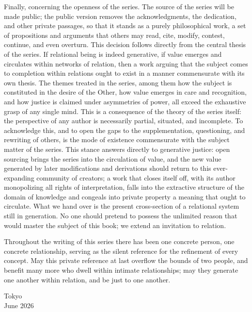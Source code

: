 \documentclass[11pt]{book}
\begin{document}
Finally, concerning the openness of the series. The source of the series will be made public; the public version removes the acknowledgments, the dedication, and other private passages, so that it stands as a purely philosophical work, a set of propositions and arguments that others may read, cite, modify, contest, continue, and even overturn. This decision follows directly from the central thesis of the series. If relational being is indeed generative, if value emerges and circulates within networks of relation, then a work arguing that the subject comes to completion within relations ought to exist in a manner commensurate with its own thesis. The themes treated in the series, among them how the subject is constituted in the desire of the Other, how value emerges in care and recognition, and how justice is claimed under asymmetries of power, all exceed the exhaustive grasp of any single mind. This is a consequence of the theory of the series itself: the perspective of any author is necessarily partial, situated, and incomplete. To acknowledge this, and to open the gaps to the supplementation, questioning, and rewriting of others, is the mode of existence commensurate with the subject matter of the series. This stance answers directly to generative justice: open sourcing brings the series into the circulation of value, and the new value generated by later modifications and derivations should return to this ever-expanding community of creators; a work that closes itself off, with its author monopolizing all rights of interpretation, falls into the extractive structure of the domain of knowledge and congeals into private property a meaning that ought to circulate. What we hand over is the present cross-section of a relational system still in generation. No one should pretend to possess the unlimited reason that would master the subject of this book; we extend an invitation to relation.

Throughout the writing of this series there has been one concrete person, one concrete relationship, serving as the silent reference for the refinement of every concept. May this private reference at last overflow the bounds of two people, and benefit many more who dwell within intimate relationships; may they generate one another within relation, and be just to one another.

\begin{flushright}
Tokyo\\
June 2026
\end{flushright}
\end{document}
